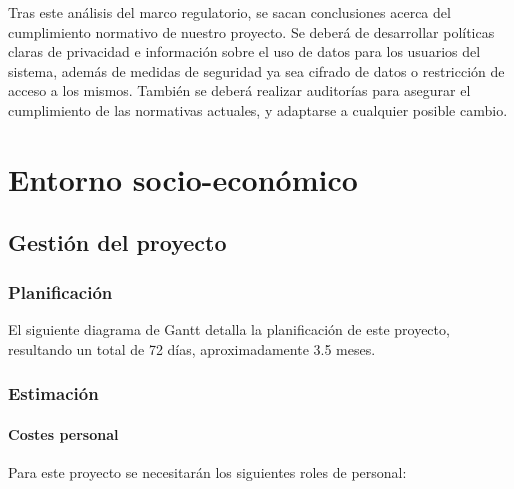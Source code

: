 \documentclass[12pt]{report} %
\begin{document}
Tras este análisis del marco regulatorio, se sacan conclusiones acerca del cumplimiento normativo de nuestro proyecto. Se deberá de desarrollar políticas claras de privacidad e información sobre el uso de datos para los usuarios del sistema, además de medidas de seguridad ya sea cifrado de datos o restricción de acceso a los mismos. También se deberá realizar auditorías para asegurar el cumplimiento de las normativas actuales, y adaptarse a cualquier posible cambio.

\chapter{Entorno socio-económico}

\section{Gestión del proyecto}

\subsection{Planificación}

El siguiente diagrama de Gantt detalla la planificación de este proyecto, resultando un total de 72 días, aproximadamente 3.5 meses. 



\subsection{Estimación}

\subsubsection{Costes personal}

Para este proyecto se necesitarán los siguientes roles de personal:
\end{document}
